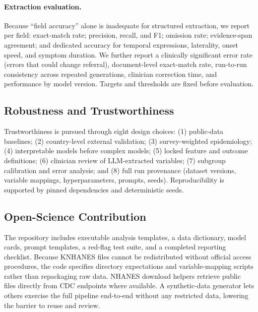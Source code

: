 \paragraph{Extraction evaluation.} Because ``field accuracy'' alone is inadequate for structured extraction, we report per field: exact-match rate; precision, recall, and F1; omission rate; evidence-span agreement; and dedicated accuracy for temporal expressions, laterality, onset speed, and symptom duration. We further report a clinically significant error rate (errors that could change referral), document-level exact-match rate, run-to-run consistency across repeated generations, clinician correction time, and performance by model version. Targets and thresholds are fixed before evaluation.

\subsection{Robustness and Trustworthiness}
Trustworthiness is pursued through eight design choices: (1) public-data baselines; (2) country-level external validation; (3) survey-weighted epidemiology; (4) interpretable models before complex models; (5) locked feature and outcome definitions; (6) clinician review of LLM-extracted variables; (7) subgroup calibration and error analysis; and (8) full run provenance (dataset versions, variable mappings, hyperparameters, prompts, seeds). Reproducibility is supported by pinned dependencies and deterministic seeds.

\subsection{Open-Science Contribution}
The repository includes executable analysis templates, a data dictionary, model cards, prompt templates, a red-flag test suite, and a completed reporting checklist. Because KNHANES files cannot be redistributed without official access procedures, the code specifies directory expectations and variable-mapping scripts rather than repackaging raw data. NHANES download helpers retrieve public files directly from CDC endpoints where available. A synthetic-data generator lets others exercise the full pipeline end-to-end without any restricted data, lowering the barrier to reuse and review.
